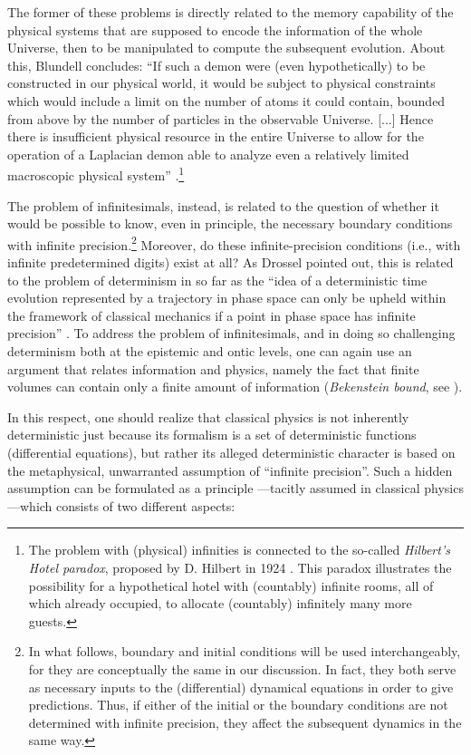 \documentclass[12pt]{article}
\begin{document}
The former of these problems is directly related to the memory capability of the physical systems that are supposed to encode the information of the whole Universe, then to be manipulated to compute the subsequent evolution. About this, Blundell concludes: ``If such a demon were (even hypothetically) to be constructed in our physical world, it would be subject to physical constraints which would include a limit on the number of atoms it could contain, bounded from above by the number of particles in the observable Universe. [...] Hence there is insufficient physical resource in the entire Universe to allow for the operation of a Laplacian demon able to analyze even a relatively limited macroscopic physical system'' \cite{blundell}.\footnote{The problem with (physical) infinities is connected to the so-called \emph{Hilbert's Hotel paradox}, proposed by D. Hilbert in 1924 \cite{hilbert}. This paradox illustrates the possibility for a hypothetical hotel with (countably) infinite rooms, all of which already occupied, to allocate (countably) infinitely many more guests.}

The problem of infinitesimals, instead, is related to the question of whether it would be possible to know, even in principle, the necessary boundary conditions with infinite precision.\footnote{In what follows, boundary and initial conditions will be used interchangeably, for they are conceptually the same in our discussion. In fact, they both serve as necessary inputs to the (differential) dynamical equations in order to give predictions. Thus, if either of the initial or the boundary conditions are not determined with infinite precision, they affect the subsequent dynamics in the same way.} Moreover, do these infinite-precision conditions (i.e., with infinite predetermined digits) exist at all?  As Drossel pointed out, this is related to the problem of determinism in so far as the  ``idea of a deterministic time evolution represented by a trajectory in phase space can only be upheld within the framework of classical mechanics if a point in phase space has infinite precision'' \cite{drossel}. To address the problem of infinitesimals, and in doing so challenging determinism both at the epistemic and ontic levels, one can again use an argument that relates information and physics, namely the fact that finite volumes can contain only a finite amount of information (\emph{Bekenstein bound}, see \cite{gisin1}).

In this respect, one should realize that classical physics is not inherently deterministic just because its formalism is a set of deterministic functions (differential equations), but rather its alleged deterministic character is based on the metaphysical, unwarranted assumption of ``infinite precision''. Such a hidden assumption can be formulated as a principle ---tacitly assumed in classical physics---which consists of two different aspects:
\end{document}
